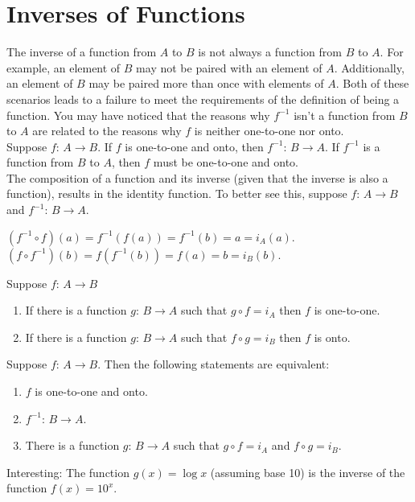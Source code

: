 \documentclass{article}
\begin{document}
\section{Inverses of Functions}
The inverse of a function from $A$ to $B$ is not always a function from $B$ to $A$. For example, an element of $B$ may not be paired with an element of $A$. Additionally, an element of $B$ may be paired more than once with elements of $A$. Both of these scenarios leads to a failure to meet the requirements of the definition of being a function. You may have noticed that the reasons why $f^{-1}$ isn't a function from $B$ to $A$ are related to the reasons why $f$ is neither one-to-one nor onto.\\

\noindent Suppose $f \text{: } A \to B$. If $f$ is one-to-one and onto, then $f^{-1} \text{: } B \to A$. If $f^{-1}$ is a function from $B$ to $A$, then $f$ must be one-to-one and onto. \\

\noindent The composition of a function and its inverse (given that the inverse is also a function), results in the identity function. To better see this, suppose $f \text{: } A \to B$ and $f^{-1} \text{: } B \to A$.
\begin{center}
    $(f^{-1} \circ f)(a) = f^{-1}(f(a)) = f^{-1}(b) = a = i_{A}(a)$.
$(f \circ f^{-1})(b) = f(f^{-1}(b)) = f(a) = b = i_{B}(b)$.
\end{center}
Suppose $f \text{: } A \to B$
\begin{enumerate}
    \item If there is a function $g \text{: } B \to A$ such that $g \circ f = i_{A}$ then $f$ is one-to-one.
    \item If there is a function $g \text{: } B \to A$ such that $f \circ g = i_{B}$ then $f$ is onto.
\end{enumerate}
Suppose $f \text{: } A \to B$. Then the following statements are equivalent:
\begin{enumerate}
    \item $f$ is one-to-one and onto.
    \item $f^{-1} \text{: } B \to A$.
    \item There is a function $g \text{: } B \to A$ such that $g \circ f = i_{A}$ and $f \circ g = i_{B}$.
\end{enumerate}
Interesting: The function $g(x) = \log x$ (assuming base 10) is the inverse of the function $f(x) = 10^{x}$.
\end{document}
